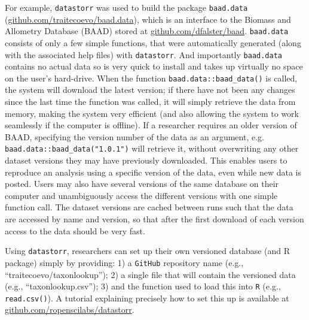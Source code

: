 \documentclass[a4paper,11pt]{article}
\newcommand{\smurl}[1]{{\footnotesize\url{#1}}}
\begin{document}
For example, \texttt{datastorr} was used to build the package \texttt{baad.data} (\smurl{github.com/traitecoevo/baad.data}), which is an interface to the Biomass and Allometry Database (\textsc{BAAD}) \citep{Falster-2015} stored at \smurl{github.com/dfalster/baad}. \texttt{baad.data} consists of only a few simple functions, that were automatically generated (along with the associated help files) with \texttt{datastorr}. And importantly \texttt{baad.data} contains no actual data so is very quick to install and takes up virtually no space on the user's hard-drive.
When the function \texttt{baad.data::baad\_data()} is called, the system will download the latest version; if there have not been any changes since the last time the function was called, it will simply retrieve the data from memory, making the system very efficient (and also allowing the system to work seamlessly if the computer is offline). If a researcher requires an older version of \textsc{BAAD}, specifying the version number of the data as an argument, e.g. \texttt{baad.data::baad\_data("1.0.1")} will retrieve it, without overwriting any other dataset versions they may have previously downloaded. This enables users to reproduce an analysis using a specific version of the data, even while new data is posted.  Users may also have several versions of the same database on their computer and unambiguously access the different versions with one simple function call. The dataset versions are cached between runs such that the data are accessed by name and version, so that after the first download of each version access to the data should be very fast.  


Using \texttt{datastorr}, researchers can set up their own versioned database (and R package) simply by providing: 1) a \texttt{GitHub} repository name (e.g., ``traitecoevo/taxonlookup''); 2) a single file that will contain the versioned data (e.g., ``taxonlookup.csv''); 3) and the function used to load this into \texttt{R} (e.g., \texttt{read.csv()}). A tutorial explaining precisely how to set this up is available at \smurl{github.com/ropenscilabs/datastorr}.
\end{document}

